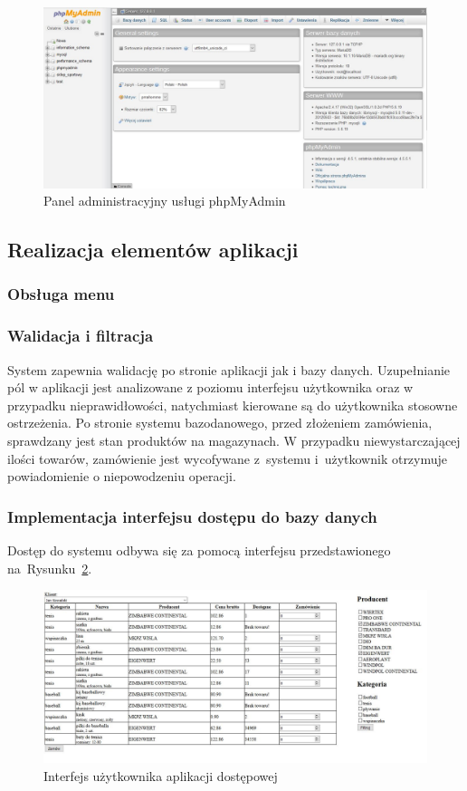 \documentclass[a4paper, 12pt]{article}
\begin{document}
\begin{figure}[H]
	\centering
	\includegraphics[width=15cm]{phpmyadmin.jpg}
	\caption[Panel administracyjny usługi phpMyAdmin]{Panel administracyjny usługi phpMyAdmin}
	\label{fig:phpMyAdmin}
\end{figure}
\subsection{Realizacja elementów aplikacji}
\subsubsection{Obsługa menu}
\subsubsection{Walidacja i filtracja}
System zapewnia walidację po stronie aplikacji jak i bazy danych. Uzupełnianie pól w aplikacji jest analizowane z poziomu interfejsu użytkownika oraz w przypadku nieprawidłowości, natychmiast kierowane są do użytkownika stosowne ostrzeżenia. Po stronie systemu bazodanowego, przed złożeniem zamówienia, sprawdzany jest stan produktów na magazynach. W przypadku niewystarczającej ilości towarów, zamówienie jest wycofywane z~systemu i~użytkownik otrzymuje powiadomienie o niepowodzeniu operacji.
\subsubsection{Implementacja interfejsu dostępu do bazy danych}
Dostęp do systemu odbywa się za pomocą interfejsu przedstawionego na~Rysunku~\ref{fig:interfejsUżytkownika}.

\begin{figure}[H]
	\includegraphics[width=14cm]{Screeny/Filtrowanie2.JPG}
	\caption[Interfejs użytkownika]{Interfejs użytkownika aplikacji dostępowej}
	\label{fig:interfejsUżytkownika}
\end{figure}
\end{document}
